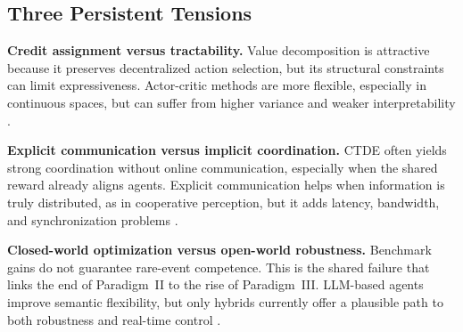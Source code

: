 \documentclass[12pt, a4paper]{article}
\begin{document}
\subsection{Three Persistent Tensions}

\textbf{Credit assignment versus tractability.}
Value decomposition is attractive because it preserves decentralized action
selection, but its structural constraints can limit expressiveness. Actor-critic
methods are more flexible, especially in continuous spaces, but can suffer from
higher variance and weaker interpretability
\cite{sunehag2018value,rashid2018qmix,foerster2018counterfactual,lowe2017multi,peng2021facmac}.

\textbf{Explicit communication versus implicit coordination.}
CTDE often yields strong coordination without online communication, especially
when the shared reward already aligns agents. Explicit communication helps when
information is truly distributed, as in cooperative perception, but it adds
latency, bandwidth, and synchronization problems
\cite{das2019tarmac,sukhbaatar2016learning,wang2020v2vnet,wang2020bandwidth}.

\textbf{Closed-world optimization versus open-world robustness.}
Benchmark gains do not guarantee rare-event competence. This is the shared
failure that links the end of Paradigm~II to the rise of Paradigm~III. LLM-based
agents improve semantic flexibility, but only hybrids currently offer a plausible
path to both robustness and real-time control
\cite{caesar2021nuplan,fu2023drive,wen2023dilu,sha2023languagempc}.
\end{document}

